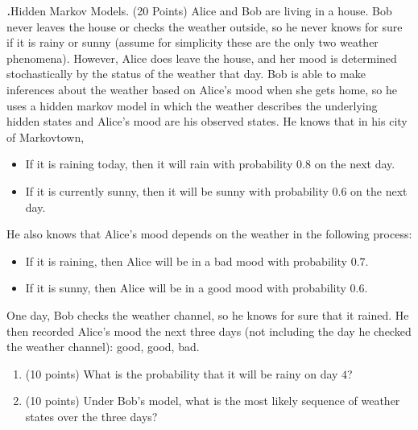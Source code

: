 \documentclass[12pt]{amsart}
\newenvironment{statement}[1]{\smallskip\noindent\color[rgb]{0.0,0.0,0.0} {\bf #1.}}{}
\newcommand{\1}{\mathds{1}}
\begin{document}
\begin{statement}{4}
\textit{Hidden Markov Models.} (20 Points) Alice and Bob are living in a house. Bob never leaves the house or checks the weather outside, so he never knows for sure if it is rainy or sunny (assume for simplicity these are the only two weather phenomena).
However, Alice does leave the house, and her mood is determined stochastically by the status of the weather that day.
Bob is able to make inferences about the weather based on Alice's mood when she gets home, so he uses a hidden markov model in which the weather describes the underlying hidden states and Alice's mood are his observed states. He knows that in his city of Markovtown, 
\begin{itemize}
    \item If it is raining today, then it will rain with probability $0.8$ on the next day.
    \item If it is currently sunny, then it will be sunny with probability $0.6$ on the next day.
\end{itemize}
He also knows that Alice's mood depends on the weather in the following process:
\begin{itemize}
    \item If it is raining, then Alice will be in a bad mood with probability $0.7$.
    \item If it is sunny, then Alice will be in a good mood with probability $0.6$.
\end{itemize}
One day, Bob checks the weather channel, so he knows for sure that it rained. He then recorded Alice's mood the next three days (not including the day he checked the weather channel): good, good, bad.
\begin{enumerate}
    \item (10 points) What is the probability that it will be rainy on day $4$?
    \item (10 points) Under Bob's model, what is the most likely sequence of weather states over the three days?
\end{enumerate}
\end{statement}

\newpage
\end{document}
